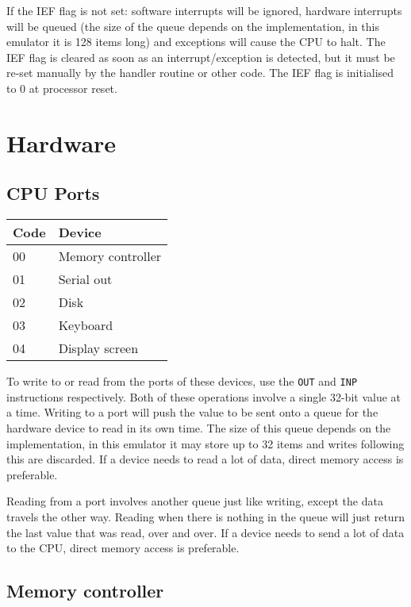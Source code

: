 \documentclass[12pt,a4paper]{report}
\begin{document}
If the IEF flag is not set: software interrupts will be ignored, hardware interrupts will be queued (the size of the queue depends on the implementation, in this emulator it is 128 items long) and exceptions will cause the CPU to halt. The IEF flag is cleared as soon as an interrupt/exception is detected, but it must be re-set manually by the handler routine or other code. The IEF flag is initialised to 0 at processor reset.

\section{Hardware}

\subsection*{CPU Ports}

\begin{center}
  \begin{tabular}{|l|l|}
    \hline
    Code & Device            \\
    \hline
    00   & Memory controller \\
    01   & Serial out        \\
    02   & Disk              \\
    03   & Keyboard          \\
    04   & Display screen    \\
    \hline
  \end{tabular}
\end{center}

To write to or read from the ports of these devices, use the \texttt{OUT} and \texttt{INP} instructions respectively. Both of these operations involve a single 32-bit value at a time. Writing to a port will push the value to be sent onto a queue for the hardware device to read in its own time. The size of this queue depends on the implementation, in this emulator it may store up to 32 items and writes following this are discarded. If a device needs to read a lot of data, direct memory access is preferable.

Reading from a port involves another queue just like writing, except the data travels the other way. Reading when there is nothing in the queue will just return the last value that was read, over and over. If a device needs to send a lot of data to the CPU, direct memory access is preferable.

\subsection*{Memory controller} \label{mempaging}
\end{document}
